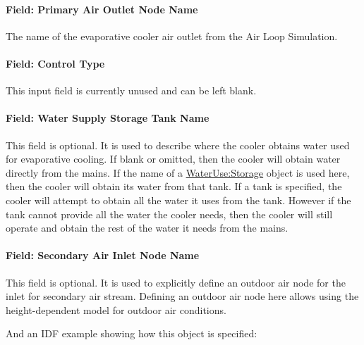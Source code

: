 \paragraph{Field: Primary Air Outlet Node Name}\label{field-primary-air-outlet-node-name-1}

The name of the evaporative cooler air outlet from the Air Loop Simulation.

\paragraph{Field: Control Type}\label{field-control-type-2}

This input field is currently unused and can be left blank.

\paragraph{Field: Water Supply Storage Tank Name}\label{field-water-supply-storage-tank-name-3}

This field is optional. It is used to describe where the cooler obtains water used for evaporative cooling. If blank or omitted, then the cooler will obtain water directly from the mains. If the name of a \hyperref[waterusestorage]{WaterUse:Storage} object is used here, then the cooler will obtain its water from that tank. If a tank is specified, the cooler will attempt to obtain all the water it uses from the tank. However if the tank cannot provide all the water the cooler needs, then the cooler will still operate and obtain the rest of the water it needs from the mains.

\paragraph{Field: Secondary Air Inlet Node Name}\label{field-secondary-air-inlet-node-name-1-000}

This field is optional. It is used to explicitly define an outdoor air node for the inlet for secondary air stream. Defining an outdoor air node here allows using the height-dependent model for outdoor air conditions.

And an IDF example showing how this object is specified:

